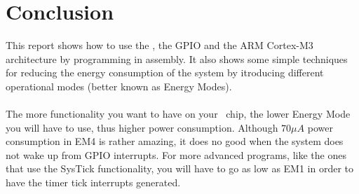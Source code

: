 \section{Conclusion}
This report shows how to use the \boardName, the GPIO and the ARM Cortex-M3 architecture by programming in assembly. It also shows some simple techniques for reducing the energy consumption of the system by itroducing different operational modes (better known as Energy Modes). \\
\\
The more functionality you want to have on your \boardName ~chip, the lower Energy Mode you will have to use, thus higher power consumption. Although $70\mu A$ power consumption in EM4 is rather amazing, it does no good when the system does not wake up from GPIO interrupts. For more advanced programs, like the ones that use the SysTick functionality, you will have to go as low as EM1 in order to have the timer tick interrupts generated.

